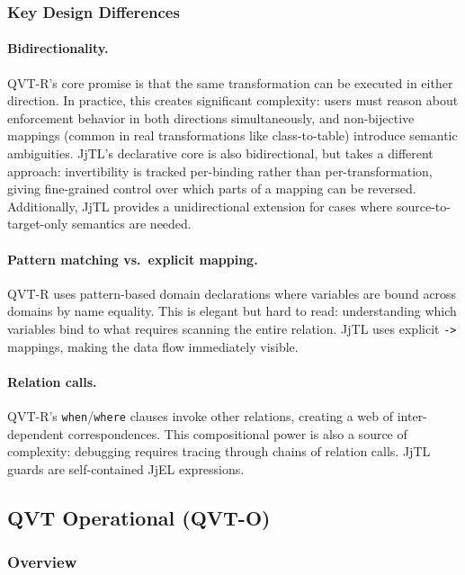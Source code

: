 \documentclass[11pt,a4paper]{article}
\newcommand{\jjel}{\textsf{JjEL}}
\newcommand{\jjtl}{\textsf{JjTL}}
\begin{document}
\subsubsection{Key Design Differences}

\paragraph{Bidirectionality.} QVT-R's core promise is that the same transformation can be executed in either direction. In practice, this creates significant complexity: users must reason about enforcement behavior in both directions simultaneously, and non-bijective mappings (common in real transformations like class-to-table) introduce semantic ambiguities. \jjtl{}'s declarative core is also bidirectional, but takes a different approach: invertibility is tracked per-binding rather than per-transformation, giving fine-grained control over which parts of a mapping can be reversed. Additionally, \jjtl{} provides a unidirectional extension for cases where source-to-target-only semantics are needed.

\paragraph{Pattern matching vs.\ explicit mapping.} QVT-R uses pattern-based domain declarations where variables are bound across domains by name equality. This is elegant but hard to read: understanding which variables bind to what requires scanning the entire relation. \jjtl{} uses explicit \texttt{->} mappings, making the data flow immediately visible.

\paragraph{Relation calls.} QVT-R's \texttt{when}/\texttt{where} clauses invoke other relations, creating a web of inter-dependent correspondences. This compositional power is also a source of complexity: debugging requires tracing through chains of relation calls. \jjtl{} guards are self-contained \jjel{} expressions.


\subsection{QVT Operational (QVT-O)}

\subsubsection{Overview}
\end{document}
